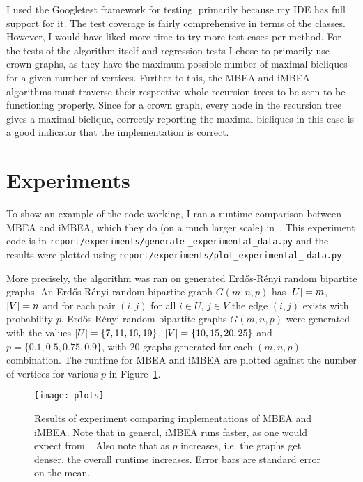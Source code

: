 I used the Googletest framework for testing, primarily because my IDE has full support for it.
The test coverage is fairly comprehensive in terms of the classes.
However, I would have liked more time to try more test cases per method.
For the tests of the algorithm itself and regression tests I chose to primarily use crown graphs, as they have the maximum possible number of maximal bicliques for a given number of vertices.
Further to this, the MBEA and iMBEA algorithms  must traverse their respective whole recursion trees to be seen to be functioning properly.
Since for a crown graph, every node in the recursion tree gives a maximal biclique, correctly reporting the maximal bicliques in this case is a good indicator that the implementation is correct.


\section{Experiments}

To show an example of the code working, I ran a runtime comparison between MBEA and iMBEA, which they do (on a much larger scale) in~\cite{Zhang2014}.
This experiment code is in \texttt{report/experiments/generate} \texttt{\_experimental\_data.py} and the results were plotted using \texttt{report/experiments/plot\_experimental\_} \texttt{data.py}.
\par
More precisely, the algorithm was ran on generated Erd\H{o}s-R\'{e}nyi random bipartite graphs.
An Erd\H{o}s-R\'enyi random bipartite graph $G(m,n,p)$ has $\abs{U} = m$, $\abs{V} =n$ and for each pair $(i,j)$ for all $i\in U$, $j\in V$ the edge $(i,j)$ exists with probability $p$.
Erd\H{o}s-R\'enyi random bipartite graphs $G(m,n,p)$ were generated with the values $\abs{U} = \{7, 11, 16, 19\}$, $\abs{V} = \{10, 15, 20, 25\}$ and $p=\{0.1, 0.5, 0.75, 0.9\}$, with 20 graphs generated for each $(m,n,p)$ combination.
The runtime for MBEA and iMBEA are plotted against the number of vertices for various $p$ in Figure~\ref{fig:plots}. 

\begin{figure}
    \centering
    \texttt{[image: plots]}
    \caption{
    Results of experiment comparing implementations of MBEA and iMBEA.
    Note that in general, iMBEA runs faster, as one would expect from~\cite{Zhang2014}.
    Also note that as $p$ increases, i.e. the graphs get denser, the overall runtime increases.
    Error bars are standard error on the mean.
    }
    \label{fig:plots}
\end{figure}


